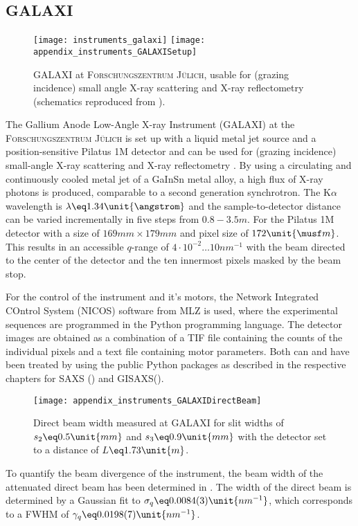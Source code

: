 \documentclass[\main/dresen_thesis.tex]{subfiles}
\begin{document}
  \subsection{GALAXI}\label{ch:lss:galaxi}
    \begin{figure}[ht]
      \centering
      \texttt{[image: instruments\_galaxi]}
      \texttt{[image: appendix\_instruments\_GALAXISetup]}
      \caption{\label{fig:lss:galaxi}GALAXI at \textsc{Forschungszentrum J\"ulich}, usable for (grazing incidence) small angle X-ray scattering and X-ray reflectometry (schematics reproduced from \cite{FZJ_2016_GALAX}).}
    \end{figure}

    The Gallium Anode Low-Angle X-ray Instrument (GALAXI) at the \textsc{Forschungszentrum J\"ulich} is set up with a liquid metal jet source and a position-sensitive Pilatus 1M detector and can be used for (grazing incidence) small-angle X-ray scattering and X-ray reflectometry \cite{FZJ_2016_GALAX}.
    By using a circulating and continuously cooled metal jet of a GaInSn metal alloy, a high flux of X-ray photons is produced, comparable to a second generation synchrotron.
    The K$\alpha$ wavelength is $\lambda \eq 1.34 \unit{\angstrom}$ and the sample-to-detector distance can be varied incrementally in five steps from $0.8 - 3.5 \unit{m}$.
    For the Pilatus 1M detector with a size of $169 \unit{mm} \times 179 \unit{mm}$ and pixel size of $172 \unit{\musf m}$.
    This results in an accessible $q$-range of $4 \cdot 10^{-2} \ldots 10 \unit{nm}^{-1}$ with the beam directed to the center of the detector and the ten innermost pixels masked by the beam stop.

    For the control of the instrument and it's motors, the Network Integrated COntrol System (NICOS) software from MLZ is used, where the experimental sequences are programmed in the Python programming language.
    The detector images are obtained as a combination of a TIF file containing the counts of the individual pixels and a text file containing motor parameters.
    Both can and have been treated by using the public Python packages as described in the respective chapters for SAXS () and GISAXS().

    \begin{figure}[ht]
      \centering
      \texttt{[image: appendix\_instruments\_GALAXIDirectBeam]}
      \caption{\label{fig:lss:galaxi:directBeam}Direct beam width measured at GALAXI for slit widths of $s_2 \eq 0.5 \unit{mm}$ and $s_3 \eq 0.9 \unit{mm}$ with the detector set to a distance of $L \eq 1.73 \unit{m}$.}
    \end{figure}
    To quantify the beam divergence of the instrument, the beam width of the attenuated direct beam has been determined in .
    The width of the direct beam is determined by a Gaussian fit to $\sigma_q \eq 0.0084(3) \unit{nm^{-1}}$, which corresponds to a FWHM of $\gamma_q \eq 0.0198(7) \unit{nm^{-1}}$.
\end{document}

